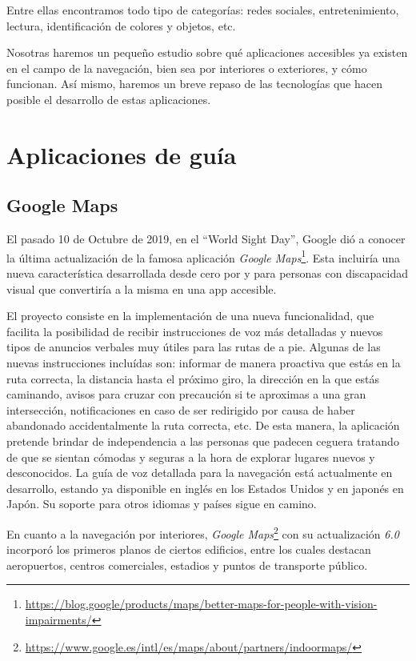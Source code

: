 Entre ellas encontramos todo tipo de categorías: redes sociales, entretenimiento, lectura, identificación de colores y objetos, etc. 

Nosotras haremos un pequeño estudio sobre qué aplicaciones accesibles ya existen en el campo de la navegación, bien sea por interiores o exteriores, y cómo funcionan. Así mismo, haremos un breve repaso de las tecnologías que hacen posible el desarrollo de estas aplicaciones.


\section{Aplicaciones de guía}
\subsection{Google Maps}
El pasado 10 de Octubre de 2019, en el ``World Sight Day'', Google dió a conocer la última actualización de la famosa aplicación \textit{Google Maps}\footnote{\url{https://blog.google/products/maps/better-maps-for-people-with-vision-impairments/}}. Esta incluiría una nueva característica desarrollada desde cero por y para personas con discapacidad visual que convertiría a la misma en una app accesible.

El proyecto consiste en la implementación de una nueva funcionalidad, que facilita la posibilidad de recibir instrucciones de voz más detalladas y nuevos tipos de anuncios verbales muy útiles para las rutas de a pie. Algunas de las nuevas instrucciones incluídas son: informar de manera proactiva que estás en la ruta correcta, la distancia hasta el próximo giro, la dirección en la que estás caminando, avisos para cruzar con precaución si te aproximas a una gran intersección, notificaciones en caso de ser redirigido por causa de haber abandonado accidentalmente la ruta correcta, etc. De esta manera, la aplicación pretende brindar de independencia a las personas que padecen ceguera tratando de que se sientan cómodas y seguras a la hora de explorar lugares nuevos y desconocidos. La guía de voz detallada para la navegación está actualmente en desarrollo, estando ya disponible en inglés en los Estados Unidos y en japonés en Japón. Su soporte para otros idiomas y países sigue en camino.

En cuanto a la navegación por interiores, \textit{Google Maps}\footnote{\url{https://www.google.es/intl/es/maps/about/partners/indoormaps/}} con su actualización \textit{6.0} incorporó los primeros planos de ciertos edificios, entre los cuales destacan aeropuertos, centros comerciales, estadios y puntos de transporte público.

